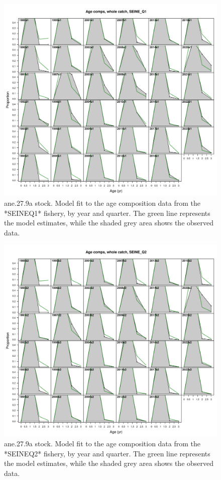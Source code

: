 \documentclass[
]{article}
\begin{document}
\begin{figure}[H]

{\centering \includegraphics[width=0.95\linewidth]{report/run/S1.0_4FLEETS/fig_age_fit_SeineQ1} 

}

\caption{ane.27.9a stock. Model fit to the age composition data from the *SEINEQ1* fishery, by year and quarter. The green line represents the model estimates, while the shaded grey area shows the observed data.}\label{fig:unnamed-chunk-19}
\end{figure}

\begin{figure}[H]

{\centering \includegraphics[width=0.95\linewidth]{report/run/S1.0_4FLEETS/fig_age_fit_SeineQ2} 

}

\caption{ane.27.9a stock. Model fit to the age composition data from the *SEINEQ2* fishery, by year and quarter. The green line represents the model estimates, while the shaded grey area shows the observed data.}\label{fig:unnamed-chunk-20}
\end{figure}
\end{document}
